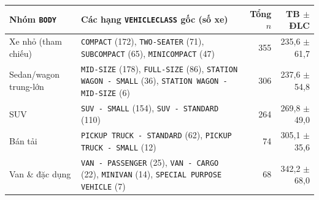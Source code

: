 \begin{tabular}{@{}l >{\raggedright\arraybackslash}p{8.4cm} r r@{}}
\toprule
Nhóm \texttt{BODY} & Các hạng \texttt{VEHICLECLASS} gốc (số xe) & Tổng $n$ & \COtwo{} TB $\pm$ ĐLC \\
\midrule
Xe nhỏ (tham chiếu) & \texttt{COMPACT} (172), \texttt{TWO-SEATER} (71), \texttt{SUBCOMPACT} (65), \texttt{MINICOMPACT} (47) & 355 & 235,6 $\pm$ 61,7 \\
Sedan/wagon trung-lớn & \texttt{MID-SIZE} (178), \texttt{FULL-SIZE} (86), \texttt{STATION WAGON - SMALL} (36), \texttt{STATION WAGON - MID-SIZE} (6) & 306 & 237,6 $\pm$ 54,8 \\
SUV & \texttt{SUV - SMALL} (154), \texttt{SUV - STANDARD} (110) & 264 & 269,8 $\pm$ 49,0 \\
Bán tải & \texttt{PICKUP TRUCK - STANDARD} (62), \texttt{PICKUP TRUCK - SMALL} (12) & 74 & 305,1 $\pm$ 35,6 \\
Van \& đặc dụng & \texttt{VAN - PASSENGER} (25), \texttt{VAN - CARGO} (22), \texttt{MINIVAN} (14), \texttt{SPECIAL PURPOSE VEHICLE} (7) & 68 & 342,2 $\pm$ 68,0 \\
\bottomrule
\end{tabular}
